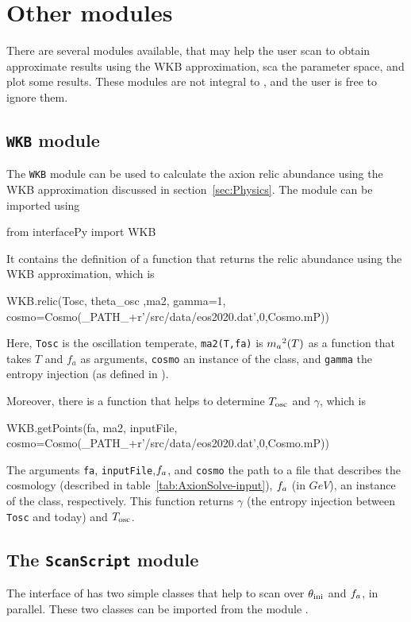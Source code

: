 \documentclass[11pt,a4paper]{article}
\begin{document}
\section{Other modules}\label{app:other_modules}
%
There are several modules available, that may help the user scan to obtain approximate results using the WKB approximation, sca the parameter space, and plot some results. These modules are not
integral to \mimes, and the user is free to ignore them.

\subsection{{\tt WKB} module}
%
The {\tt WKB} module can be used to calculate the axion relic abundance using the WKB approximation discussed in section~\ref{sec:Physics}. The module can be imported using 
%
\begin{py}
	from interfacePy import WKB
\end{py}
%
It contains the definition of a function that returns the relic abundance using the WKB approximation, which is 
%
\begin{py}
	WKB.relic(Tosc, theta_osc ,ma2, gamma=1, 
	          cosmo=Cosmo(_PATH_+r'/src/data/eos2020.dat',0,Cosmo.mP))
\end{py}
%
Here, {\tt Tosc} is the oscillation temperate, {\tt ma2(T,fa)} is $m_{a}{}^2(T)$ as a function that takes $T$ and $f_a$ as arguments, {\tt cosmo} an instance of the  class, and {\tt gamma} the entropy injection (as defined in ). 

Moreover, there is a function that helps to determine $T_{\rm osc}{}$ and $\gamma$, which is
%
\begin{py}
	WKB.getPoints(fa, ma2, inputFile, cosmo=Cosmo(_PATH_+r'/src/data/eos2020.dat',0,Cosmo.mP))
\end{py}
%
The arguments {\tt fa}, {\tt inputFile},$f_{a}{}$, and {\tt cosmo} the path to a file that describes the cosmology (described in table~\ref{tab:AxionSolve-input}), $f_{a}{}$ (in $GeV$), an instance of the  class, respectively.  
%
This function returns $\gamma$ (the entropy injection between {\tt Tosc} and today) and $T_{\rm osc}{}$.
 

\subsection{The {\tt ScanScript} module}\label{app:ScanScript}
%
The \PY interface of \mimes has two simple classes that help to scan over $\theta_{\rm ini}{}$ and $f_{a}{}$, in parallel. These two classes can be imported from the module .  
\end{document}
